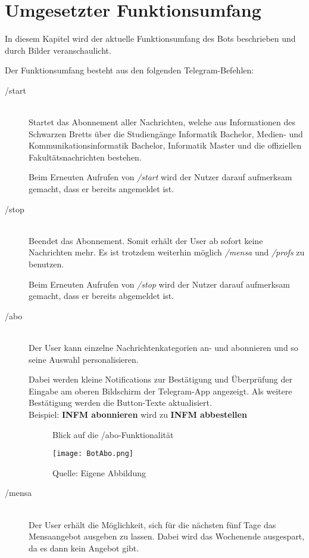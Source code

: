 \chapter{Umgesetzter Funktionsumfang}
In diesem Kapitel wird der aktuelle Funktionsumfang des Bots beschrieben und durch Bilder veranschaulicht.

Der Funktionsumfang besteht aus den folgenden Telegram-Befehlen:

\begin{description}
  \item[/start] \hfill \\
  Startet das Abonnement aller Nachrichten, welche aus Informationen des Schwarzen Bretts über die Studiengänge Informatik Bachelor, Medien- und Kommunikationsinformatik Bachelor, Informatik Master und die offiziellen Fakultätsnachrichten bestehen.

  Beim Erneuten Aufrufen von \emph{/start} wird der Nutzer darauf aufmerksam gemacht, dass er bereits angemeldet ist.
  \item[/stop] \hfill \\
  Beendet das Abonnement. Somit erhält der User ab sofort keine Nachrichten mehr. Es ist trotzdem weiterhin möglich \emph{/mensa} und \emph{/profs} zu benutzen.

  Beim Erneuten Aufrufen von \emph{/stop} wird der Nutzer darauf aufmerksam gemacht, dass er bereits abgemeldet ist.
  \newpage
  \item[/abo] \hfill \\
  Der User kann einzelne Nachrichtenkategorien an- und abonnieren und so seine Auswahl personalisieren.

  Dabei werden kleine Notifications zur Bestätigung und Überprüfung der Eingabe am oberen Bildschirm der Telegram-App angezeigt. Als weitere Bestätigung werden die Button-Texte aktualisiert. \\
  Beispiel: \textbf{INFM abonnieren} wird zu \textbf{INFM abbestellen}

  \begin{figure}[!htb]
      \centering
      \caption{Blick auf die /abo-Funktionalität}
        \texttt{[image: BotAbo.png]}
      \caption*{Quelle: Eigene Abbildung}
  \end{figure}

  \item[/mensa] \hfill \\
  Der User erhält die Möglichkeit, sich für die nächsten fünf Tage das Mensaangebot ausgeben zu lassen. Dabei wird das Wochenende ausgespart, da es dann kein Angebot gibt.


\end{description}
